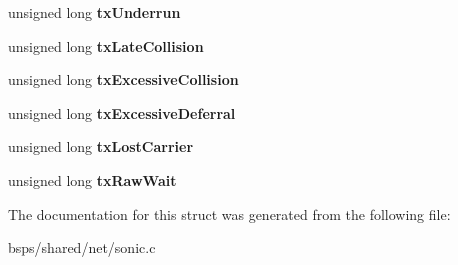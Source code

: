 \begin{DoxyCompactItemize}
unsigned long {\bfseries tx\+Underrun}
\item 
\mbox{\label{structsonic__softc_aa87e6bc0cf3db970493a1bdc80805437}} 
unsigned long {\bfseries tx\+Late\+Collision}
\item 
\mbox{\label{structsonic__softc_a4301517c6786db12b9c536ff11bb805b}} 
unsigned long {\bfseries tx\+Excessive\+Collision}
\item 
\mbox{\label{structsonic__softc_ad2c7c6ebf00d1b879f82bd9e369ccb2c}} 
unsigned long {\bfseries tx\+Excessive\+Deferral}
\item 
\mbox{\label{structsonic__softc_abed538f645b2a8ee8b99cbb72433dbec}} 
unsigned long {\bfseries tx\+Lost\+Carrier}
\item 
\mbox{\label{structsonic__softc_a7a2282601ba59712bd1ec71ee9e898a4}} 
unsigned long {\bfseries tx\+Raw\+Wait}
\end{DoxyCompactItemize}


The documentation for this struct was generated from the following file\+:\begin{DoxyCompactItemize}
\item 
bsps/shared/net/sonic.\+c\end{DoxyCompactItemize}

